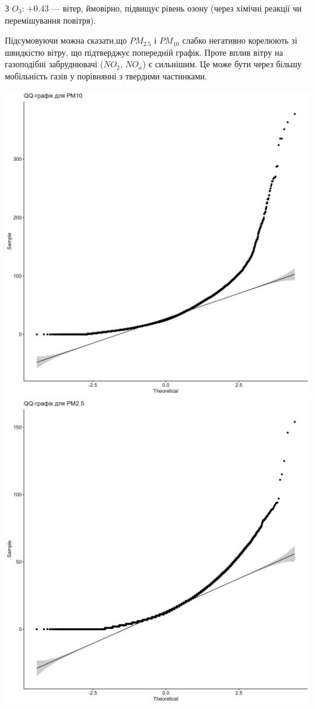 \documentclass{article}
\begin{document}
\begin{enumerate}
\begin{itemize}
        З $O_3$: +0.43 — вітер, ймовірно, підвищує рівень озону (через хімічні реакції чи перемішування повітря).
    \end{itemize}   

    Підсумовуючи можна сказати,що $PM_{2.5}$ і $ PM_{10}$ слабко негативно корелюють зі швидкістю вітру, що підтверджує попередній графік.
    Проте вплив вітру на газоподібні забруднювачі ($NO_2$, $NO_x$) є сильнішим. 
    Це може бути через більшу мобільність газів у порівнянні з твердими частинками.

    \includegraphics[width=6in]{plots/question1/qq_pm10.png}
    \includegraphics[width=6in]{plots/question1/qq_pm2_5.png}

\end{enumerate}
\end{document}
